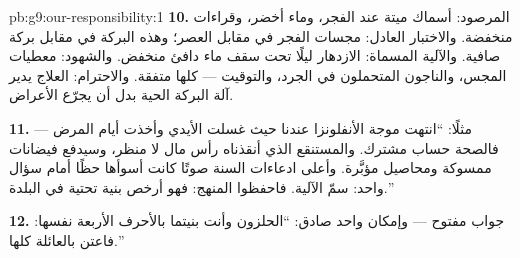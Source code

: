 \begin{solution}{pb:g9:our-responsibility:1}
\textbf{10.} المرصود: أسماك ميتة عند الفجر، وماء أخضر،
وقراءات منخفضة. والاختبار العادل: مجسات الفجر في مقابل
العصر؛ وهذه البركة في مقابل بركة صافية. والآلية المسماة:
 الازدهار ليلًا تحت سقف ماء دافئ منخفض. والشهود:
معطيات المجس، والناجون المتحملون في الجرد، والتوقيت ---
كلها متفقة. والاحترام: العلاج يدير آلة البركة الحية بدل
أن يجرّع الأعراض.

\textbf{11.} مثلًا: ``انتهت موجة الأنفلونزا عندنا حيث
غسلت الأيدي وأخذت أيام المرض --- فالصحة حساب مشترك.
والمستنقع الذي أنقذناه رأس مال لا منظر، وسيدفع فيضانات
ممسوكة ومحاصيل مؤبَّرة. وأعلى ادعاءات السنة صوتًا كانت
أسوأها حظًا أمام سؤال واحد: سمّ الآلية. فاحفظوا المنهج:
فهو أرخص بنية تحتية في البلدة.''

\textbf{12.} جواب مفتوح --- وإمكان واحد صادق: ``الحلزون
وأنت بنيتما بالأحرف الأربعة نفسها: فاعتن بالعائلة
كلها.''
\end{solution}
